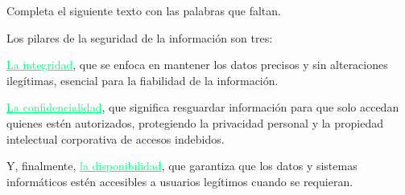 {
	Completa el siguiente texto con las palabras que faltan.
}



\begin{solution}

	Los pilares de la seguridad de la información son tres:

	\textcolor{springGreen}{\underline{La integridad}}, que se enfoca en mantener los datos precisos y sin alteraciones ilegítimas,
	esencial para la fiabilidad de la información.

	\textcolor{springGreen}{\underline{La confidencialidad}}, que significa resguardar información para que solo accedan quienes
	estén autorizados, protegiendo la privacidad personal y la propiedad intelectual corporativa
	de accesos indebidos.

	Y, finalmente, \textcolor{springGreen}{\underline{la disponibilidad}}, que garantiza que los datos y sistemas informáticos estén
	accesibles a usuarios legítimos cuando se requieran.

\end{solution}
